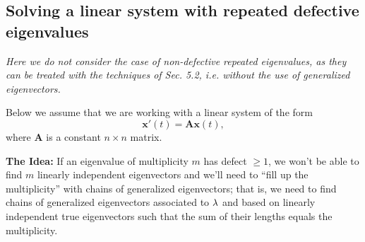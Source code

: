\documentclass[12pt]{article}
\title{}
\newcommand{\bx}{\mathbf{x}}
\newcommand{\bA}{\mathbf{A}}
\newcommand{\NI}{\noindent}
\begin{document}
\subsection*{Solving a linear system with repeated defective eigenvalues}

\textit{Here we do not consider the case of non-defective repeated eigenvalues, as they can be treated with the techniques of Sec. 5.2, i.e. without the use of generalized eigenvectors.}

\medskip

\noindent Below we assume that we are working with a linear system of the form
\begin{equation}
	\bx'(t)=\bA \bx(t),\label{ode}
\end{equation}
where $\bA$ is a constant $n\times n$ matrix.


\NI \textbf{The Idea:} If an eigenvalue of multiplicity $m$ has defect $\geq 1$, we won't be able to find $m$ linearly independent eigenvectors and we'll need to ``fill up the multiplicity'' with chains of generalized eigenvectors; that is, we need to find chains of generalized eigenvectors associated to $\lambda$ and based on linearly independent true eigenvectors such that the sum of their lengths equals the multiplicity.
\end{document}
